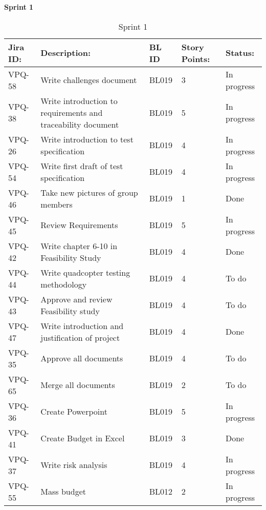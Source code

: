 \centering\Large\textbf{Sprint 1}
\begin{table}[ht]
\caption{Sprint 1}
\begin{tabularx}{\linewidth}{|m{1.5cm} m{6.65cm} m{1.2cm} m{1.5cm} m{3.5cm}|}
\hline
    \rowcolor{cadetgrey} 
     \textbf{Jira ID:} & \textbf{Description:} & \textbf{BL ID} & \textbf{Story Points:} & \textbf{Status: } \\ \hline
      VPQ-58 & Write challenges document & BL019 & 3\centering & In progress \\ 
\rowcolor{gainsboro} VPQ-38 & Write introduction to requirements and traceability document & BL019 & 5\centering & In progress  \\

              VPQ-26 & Write introduction to test specification & BL019  & 4\centering & In progress  \\
\rowcolor{gainsboro}VPQ-54 & Write first draft of test specification & BL019 & 4\centering & In progress  \\
            VPQ-46 & Take new pictures of group members & BL019 & 1\centering & Done  \\
\rowcolor{gainsboro} VPQ-45 & Review Requirements & BL019 & 5\centering & In progress  \\
              VPQ-42 & Write chapter 6-10 in Feasibility Study & BL019 & 4\centering & Done  \\
\rowcolor{gainsboro} VPQ-44 & Write quadcopter testing methodology & BL019 & 4\centering & To do  \\    
            VPQ-43 & Approve and review Feasibility study & BL019 & 4\centering & To do  \\
\rowcolor{gainsboro}  VPQ-47 & Write introduction and justification of project & BL019 & 4\centering & Done  \\
            VPQ-35 & Approve all documents & BL019 & 4\centering & To do  \\
\rowcolor{gainsboro}  VPQ-65 & Merge all documents & BL019 & 2\centering & To do  \\
            VPQ-36 & Create Powerpoint & BL019 & 5\centering & In progress  \\
\rowcolor{gainsboro}  VPQ-41 & Create Budget in Excel & BL019 & 3\centering & Done  \\
            VPQ-37 & Write risk analysis & BL019 & 4\centering & In progress  \\
\rowcolor{gainsboro}  VPQ-55 & Mass budget & BL012 & 2\centering & In progress  \\

\end{tabularx}
\end{table}
